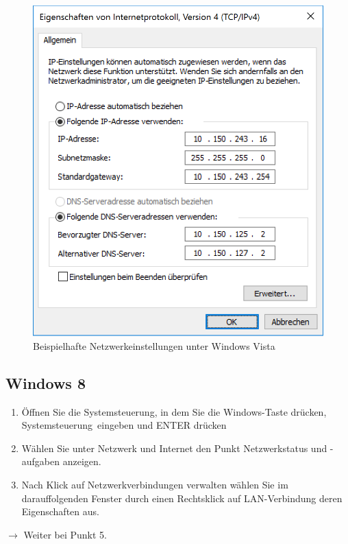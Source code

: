 \documentclass[a4paper,12pt]{scrartcl}
\begin{document}
\begin{figure}[h!]
\begin{minipage}[c]{0.48\linewidth}
          \includegraphics[width=\linewidth,keepaspectratio]{Bilder/IP_Windows}
          \caption{Beispielhafte Netzwerkeinstellungen unter Windows Vista}
        \end{minipage}
      \vspace{-20pt}
      \end{figure}
\subsection*{Windows 8}
\begin{enumerate}
	\item Öffnen Sie die Systemsteuerung, in dem Sie die Windows-Taste drücken, \glqq Systemsteuerung\grqq  \ eingeben und ENTER drücken
	\item Wählen Sie unter Netzwerk und Internet den Punkt Netzwerkstatus und -aufgaben anzeigen.
    \item Nach Klick auf Netzwerkverbindungen verwalten wählen Sie im darauffolgenden Fenster durch einen Rechtsklick auf LAN-Verbindung deren Eigenschaften aus.
\end{enumerate}
$\rightarrow$ Weiter bei Punkt 5.
\end{document}
